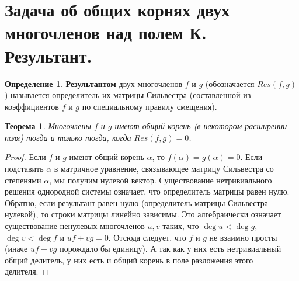 \documentclass[12pt, a4paper]{article}
\theoremstyle{definition}
\newtheorem{definition}{Определение}[section]
\theoremstyle{plain}
\newtheorem{theorem}{Теорема}[section]
\begin{document}
	\newpage
	\section{Задача об общих корнях двух многочленов над полем К. Результант.}
	
	\begin{definition}
		\textbf{Результантом} двух многочленов $f$ и $g$ (обозначается $Res(f,g)$) называется определитель их матрицы Сильвестра (составленной из коэффициентов $f$ и $g$ по специальному правилу смещения).
	\end{definition}
	
	\begin{theorem}
		Многочлены $f$ и $g$ имеют общий корень (в некотором расширении поля) тогда и только тогда, когда $Res(f,g) = 0$.
	\end{theorem}
	\begin{proof}
		Если $f$ и $g$ имеют общий корень $\alpha$, то $f(\alpha)=g(\alpha)=0$. Если подставить $\alpha$ в матричное уравнение, связывающее матрицу Сильвестра со степенями $\alpha$, мы получим нулевой вектор. Существование нетривиального решения однородной системы означает, что определитель матрицы равен нулю. \\
		Обратно, если результант равен нулю (определитель матрицы Сильвестра нулевой), то строки матрицы линейно зависимы. Это алгебраически означает существование ненулевых многочленов $u, v$ таких, что $\deg u < \deg g$, $\deg v < \deg f$ и $u f + v g = 0$. Отсюда следует, что $f$ и $g$ не взаимно просты (иначе $u f + v g$ порождало бы единицу). А так как у них есть нетривиальный общий делитель, у них есть и общий корень в поле разложения этого делителя.
	\end{proof}
\end{document}
